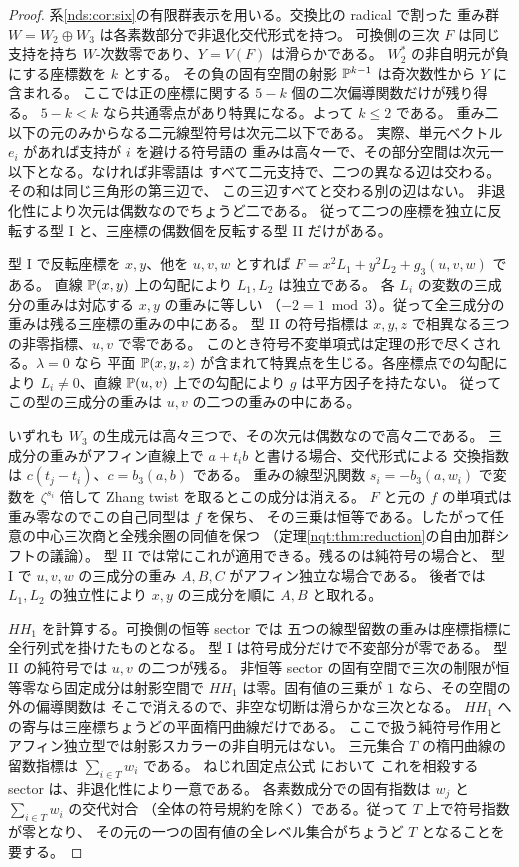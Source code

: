 \begin{proof}
系\ref{nds:cor:six}の有限群表示を用いる。交換比の radical で割った
重み群 $W=W_2\oplus W_3$ は各素数部分で非退化交代形式を持つ。
可換側の三次 $F$ は同じ支持を持ち $W$-次数零であり、$Y=V(F)$ は滑らかである。
$W_2^*$ の非自明元が負にする座標数を $k$ とする。
その負の固有空間の射影 $\mathbb P^{k-1}$ は奇次数性から $Y$ に含まれる。
ここでは正の座標に関する $5-k$ 個の二次偏導関数だけが残り得る。
$5-k<k$ なら共通零点があり特異になる。よって $k\le2$ である。
重み二以下の元のみからなる二元線型符号は次元二以下である。
実際、単元ベクトル $e_i$ があれば支持が $i$ を避ける符号語の
重みは高々一で、その部分空間は次元一以下となる。なければ非零語は
すべて二元支持で、二つの異なる辺は交わる。その和は同じ三角形の第三辺で、
この三辺すべてと交わる別の辺はない。
非退化性により次元は偶数なのでちょうど二である。
従って二つの座標を独立に反転する型 I と、三座標の偶数個を反転する型 II だけがある。

型 I で反転座標を $x,y$、他を $u,v,w$ とすれば
$F=x^2L_1+y^2L_2+g_3(u,v,w)$ である。
直線 $\mathbb P(x,y)$ 上の勾配により $L_1,L_2$ は独立である。
各 $L_i$ の変数の三成分の重みは対応する $x,y$ の重みに等しい
（$-2=1\bmod3$）。従って全三成分の重みは残る三座標の重みの中にある。
型 II の符号指標は $x,y,z$ で相異なる三つの非零指標、$u,v$ で零である。
このとき符号不変単項式は定理の形で尽くされる。$\lambda=0$ なら
平面 $\mathbb P(x,y,z)$ が含まれて特異点を生じる。各座標点での勾配により
$L_i\ne0$、直線 $\mathbb P(u,v)$ 上での勾配により $g$ は平方因子を持たない。
従ってこの型の三成分の重みは $u,v$ の二つの重みの中にある。

いずれも $W_3$ の生成元は高々三つで、その次元は偶数なので高々二である。
三成分の重みがアフィン直線上で $a+t_i b$ と書ける場合、交代形式による
交換指数は $c(t_j-t_i)$、$c=b_3(a,b)$ である。
重みの線型汎関数 $s_i=-b_3(a,w_i)$ で変数を $\zeta^{s_i}$ 倍して
Zhang twist を取るとこの成分は消える。
$F$ と元の $f$ の単項式は重み零なのでこの自己同型は $f$ を保ち、
その三乗は恒等である。したがって任意の中心三次商と全残余圏の同値を保つ
（定理\ref{nqt:thm:reduction}の自由加群シフトの議論）。
型 II では常にこれが適用できる。残るのは純符号の場合と、
型 I で $u,v,w$ の三成分の重み $A,B,C$ がアフィン独立な場合である。
後者では $L_1,L_2$ の独立性により $x,y$ の三成分を順に $A,B$ と取れる。

$HH_1$ を計算する。可換側の恒等 sector では
五つの線型留数の重みは座標指標に全行列式を掛けたものとなる。
型 I は符号成分だけで不変部分が零である。
型 II の純符号では $u,v$ の二つが残る。
非恒等 sector の固有空間で三次の制限が恒等零なら固定成分は射影空間で
$HH_1$ は零。固有値の三乗が $1$ なら、その空間の外の偏導関数は
そこで消えるので、非空な切断は滑らかな三次となる。
$HH_1$ への寄与は三座標ちょうどの平面楕円曲線だけである。
ここで扱う純符号作用とアフィン独立型では射影スカラーの非自明元はない。
三元集合 $T$ の楕円曲線の留数指標は $\sum_{i\in T}w_i$ である。
ねじれ固定点公式 \cite[Theorem~6]{QFOBaranovskyPetrov} において
これを相殺する sector は、非退化性により一意である。
各素数成分での固有指数は $w_j$ と $\sum_{i\in T}w_i$ の交代対合
（全体の符号規約を除く）である。従って $T$ 上で符号指数が零となり、
その元の一つの固有値の全レベル集合がちょうど $T$ となることを要する。


\end{proof}
